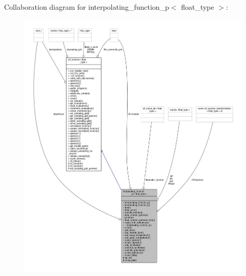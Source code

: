 Collaboration diagram for interpolating\+\_\+function\+\_\+p$<$ float\+\_\+type $>$\+:
\nopagebreak
\begin{figure}[H]
\begin{center}
\leavevmode
\includegraphics[width=350pt]{classinterpolating__function__p__coll__graph}
\end{center}
\end{figure}
